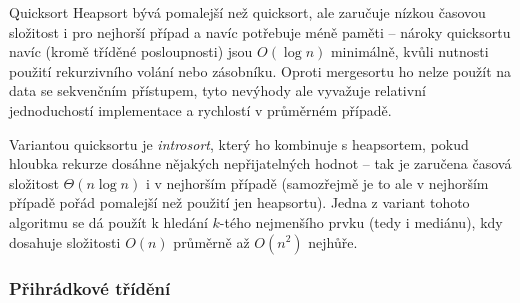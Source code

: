 \begin{algoritmusN}{Quicksort}
Heapsort bývá pomalejší než quicksort, ale zaručuje nízkou časovou složitost i pro nejhorší případ a navíc potřebuje méně paměti -- nároky quicksortu navíc (kromě tříděné posloupnosti) jsou $O(\log n)$ minimálně, kvůli nutnosti použití rekurzivního volání nebo zásobníku. Oproti mergesortu ho nelze použít na data se sekvenčním přístupem, tyto nevýhody ale vyvažuje relativní jednoduchostí implementace a rychlostí v průměrném případě.

Variantou quicksortu je \emph{introsort}, který ho kombinuje s heapsortem, pokud hloubka rekurze dosáhne nějakých nepřijatelných hodnot -- tak je zaručena časová složitost $\Theta(n\log n)$ i v nejhorším případě (samozřejmě je to ale v nejhorším případě pořád pomalejší než použití jen heapsortu). Jedna z variant tohoto algoritmu se dá použít k hledání $k$-tého nejmenšího prvku (tedy i mediánu), kdy dosahuje složitosti $O(n)$ průměrně až $O(n^2)$ nejhůře.
\end{algoritmusN}


\subsubsection*{Přihrádkové třídění}

